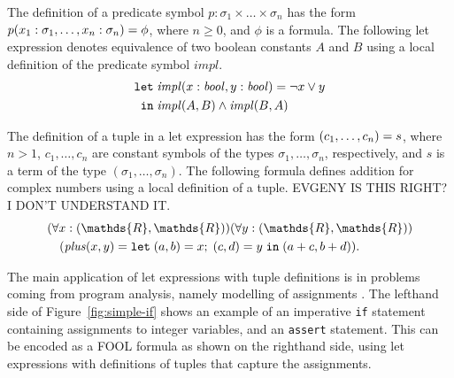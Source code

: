 \documentclass{easychair}
\begin{document}
The definition of a predicate symbol $p:\sigma_1\times\ldots\times\sigma_n$ has 
the form ${p(x_1:\sigma_1,\ldots,x_n:\sigma_n)}={\phi}$, where 
$n \geq 0$, and $\phi$ is a formula.
The following let expression denotes equivalence of two boolean constants 
$A$ and $B$ using a local definition of the predicate symbol $\mathit{impl}$.
\begin{equation}\label{eq:fool-let-impl}
\begin{aligned}
\mathtt{let}\;&{\mathit{impl}(x:\mathit{bool},y:\mathit{bool})}={\neg x \lor y}\\
 \mathtt{in}\;&\mathit{impl}(A,B)\wedge\mathit{impl}(B,A)
\end{aligned}
\end{equation}

The definition of a tuple in a let expression has the form 
${(c_1,\ldots,c_n)}={s}$, where $n > 1$, $c_1,\ldots,c_n$ are constant 
symbols of the types $\sigma_1,\ldots,\sigma_n$, respectively, and $s$ is a 
term of the type $(\sigma_1,\ldots,\sigma_n)$. 
The following formula defines addition for complex numbers using a local 
definition of a tuple.
EVGENY IS THIS RIGHT? I DON'T UNDERSTAND IT.
\begin{equation}\label{eq:fool-tuple-let}
  \begin{aligned}
  &(\forall x:(\mathds{R},\mathds{R}))(\forall y:(\mathds{R},\mathds{R}))\\
  &\quad(\mathit{plus}(x,y) = \letinpar{(a,b)}{x}{(c,d)}{y}{\tuple{a+c,b+d}).}
  \end{aligned}
\end{equation}

The main application of let expressions with tuple definitions is in 
problems coming from program analysis, namely modelling of assignments
\cite{KKV18}.
The lefthand side of Figure~\ref{fig:simple-if} shows an example of an 
imperative \texttt{if} statement containing assignments to integer variables, 
and an \texttt{assert} statement. 
This can be encoded as a FOOL formula as shown on the righthand side, using 
let expressions with definitions of tuples that capture the assignments.
\end{document}
